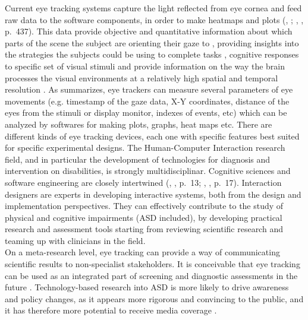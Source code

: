 Current eye tracking systems capture the light reflected from eye cornea and feed raw data to the software components, in order to make heatmaps and plots (\citeauthor{subrahmaniam2013animation}, \citeyear{subrahmaniam2013animation}; \citeauthor{baxter2015understanding}, \citeyear{baxter2015understanding}, p.~437). This data provide objective and quantitative information about which parts of the scene the subject are orienting their gaze to \citep{pensiero2009saccades}, providing insights into the strategies the subjects could be using to complete tasks \citep{boraston2007eyetrackingASD}, cognitive responses to specific set of visual stimuli \citep{subrahmaniam2013animation} and provide information on the way the brain processes the visual environments at a relatively high spatial and temporal resolution \citep{vandergeest2002humanfigures}. As \cite{subrahmaniam2013animation} summarizes, eye trackers can measure several parameters of eye movements (e.g. timestamp of the gaze data, X-Y coordinates, distance of the eyes from the stimuli or display monitor, indexes of events, etc) which can be analyzed by softwares for making plots, graphs, heat maps etc. There are different kinds of eye tracking devices, each one with specific features best suited for specific experimental designs.
The Human-Computer Interaction research field, and in particular the development of technologies for diagnosis and intervention on disabilities, is strongly multidisciplinar. Cognitive sciences and software engineering are closely intertwined (\citeauthor{benyon2014designing}, \citeyear{benyon2014designing}, p.~13; \citeauthor{lazar2010researchmethods}, \citeyear{lazar2010researchmethods}, p.~17). Interaction designers are experts in developing interactive systems, both from the design and implementation perspectives. They can effectively contribute to the study of physical and cognitive impairments (ASD included), by developing practical research and assessment tools starting from reviewing scientific research and teaming up with clinicians in the field.\\
On a meta-research level, eye tracking can provide a way of communicating scientific results to non-specialist stakeholders. It is conceivable that eye tracking can be used as an integrated part of screening and diagnostic assessments in the future \citep{falck-ytter2013eyetrackingASD}. Technology-based research into ASD is more likely to drive awareness and policy changes, as it appears more rigorous and convincing to the public, and it has therefore more potential to receive media coverage  \citep{bolte2016detection}.\\

